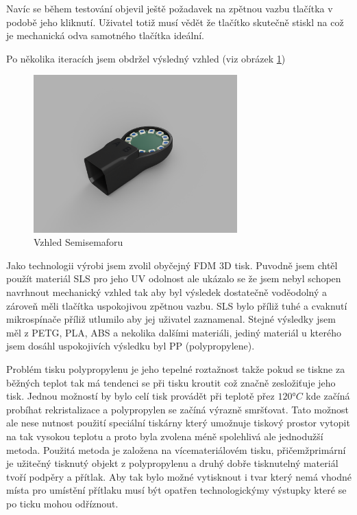 Navíc se během testování objevil ještě požadavek na zpětnou vazbu tlačítka v podobě jeho kliknutí. 
Uživatel totiž musí vědět že tlačítko skutečně stiskl na což je mechanická odva samotného tlačítka ideální.

Po několika iteracích jsem obdržel výsledný vzhled (viz obrázek \ref{semisemafor-box-render})
\begin{figure}[!h]
  \begin{center}
    \includegraphics[width=0.7\textwidth]{text/PraktickaCast/img/SemiSemafor-BOX-render.png}
  \end{center}
  \label{semisemafor-box-render}
  \caption{Vzhled Semisemaforu}
\end{figure}

Jako technologii výrobi jsem zvolil obyčejný FDM 3D tisk.
Puvodně jsem chtěl použít materiál SLS pro jeho UV odolnost ale ukázalo se že jsem nebyl schopen navrhnout mechanický vzhled tak aby byl výsledek dostatečně voděodolný a zároveň měli tlačítka uspokojivou zpětnou vazbu.
SLS bylo příliž tuhé a cvaknutí mikrospínače příliž utlumilo aby jej uživatel zaznamenal.
Stejné výsledky jsem měl z PETG, PLA, ABS a nekolika dalšími materiáli, jediný materiál u kterého jsem dosáhl uspokojivích výsledku byl PP (polypropylene).

Problém tisku polypropylenu je jeho tepelné roztažnost takže pokud se tiskne za běžných teplot tak má tendenci se při tisku kroutit což značně zesložiťuje jeho tisk.
Jednou možností by bylo celí tisk provádět při teplotě přez \(120°C\) kde začíná probíhat rekristalizace a polypropylen se začíná výrazně smršťovat.
Tato možnost ale nese nutnost použití speciální tiskárny který umožnuje tiskový prostor vytopit na tak vysokou teplotu a proto byla zvolena méně spolehlivá ale jednodužší metoda.
Použitá metoda je založena na vícemateriálovém tisku, přičemžprimární je užitečný tisknutý objekt z polypropylenu a druhý dobře tisknutelný materiál tvoří podpěry a přítlak.
Aby tak bylo možné vytisknout i tvar který nemá vhodné místa pro umístění přítlaku musí být opatřen technologickýmy výstupky které se po ticku mohou odříznout.

